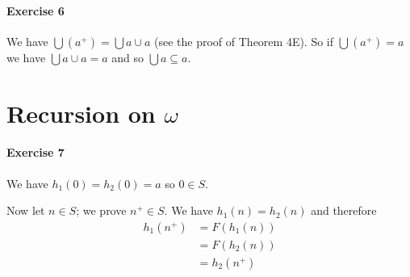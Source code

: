 \documentclass{report}
\begin{document}
    \paragraph{Exercise 6}
    We have $\bigcup (a^+) = \bigcup a \cup a$ (see the proof of Theorem 4E). So if $\bigcup (a^+) = a$
    we have $\bigcup a \cup a = a$ and so $\bigcup a \subseteq a$.

    \section{Recursion on $\omega$}

    \paragraph{Exercise 7}
    We have $h_1(0) = h_2(0) = a$ so $0 \in S$.

    Now let $n \in S$; we prove $n^+ \in S$. We have $h_1(n) = h_2(n)$ and therefore
    \begin{align*}
        h_1(n^+) & = F(h_1(n)) \\
        & = F(h_2(n)) \\
        & = h_2(n^+)
    \end{align*}
\end{document}
